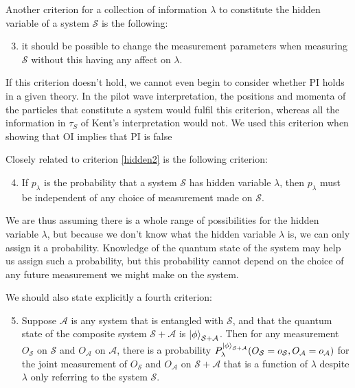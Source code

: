 Another criterion for a collection of information $\lambda$ to constitute the hidden variable of a system $\mathcal{S}$ is the following: 
\begin{enumerate}
	\setcounter{enumi}{2}
\item \label{hidden2} it should be possible to change the measurement parameters when measuring $\mathcal{S}$ without this having any affect on $\lambda$. 
\end{enumerate} 
If this criterion doesn't hold, we cannot even begin to consider whether PI holds in a given theory. In the pilot wave interpretation, the positions and momenta of the particles that constitute a system would fulfil this criterion, whereas all the information in $\tau_S$ of Kent's interpretation would not. We used this criterion when showing that OI implies that PI is false

Closely related to criterion \ref{hidden2} is the following criterion: 
\begin{enumerate}
	\setcounter{enumi}{3}
	\item \label{hidden5} If $p_\lambda$ is the probability that a system $\mathcal{S}$ has hidden variable $\lambda$, then $p_\lambda$ must be independent of any choice of measurement made on $\mathcal{S}$.
\end{enumerate} 
We are thus assuming there is a whole range of possibilities for the hidden variable $\lambda$, but because we don't know what the hidden variable $\lambda$ is, we can only assign it a probability. Knowledge of the quantum state of the system may help us assign such a probability, but this probability cannot depend on the choice of any future measurement we might make on the system.

We should also state explicitly a fourth criterion:
\begin{enumerate}
	\setcounter{enumi}{4}
	\item \label{hidden4} Suppose  $\mathcal{A}$ is any system that is entangled with $\mathcal{S}$, and that the quantum state of the composite system $\mathcal{S}+\mathcal{A}$  is $\ket{\phi}_{\mathcal{S}+\mathcal{A}}$. Then for any measurement $O_\mathcal{S}$ on $\mathcal{S}$ and $O_\mathcal{A}$ on $\mathcal{A}$, there is a probability $P_\lambda^{\ket{\phi}_{\mathcal{S}+\mathcal{A}}}(O_\mathcal{S}=o_\mathcal{S},O_\mathcal{A}=o_\mathcal{A})$ for the joint measurement of $O_\mathcal{S}$ and $O_\mathcal{A}$ on $\mathcal{S}+\mathcal{A}$ that is a function of $\lambda$  despite $\lambda$ only referring to the system $\mathcal{S}$.	
\end{enumerate}

